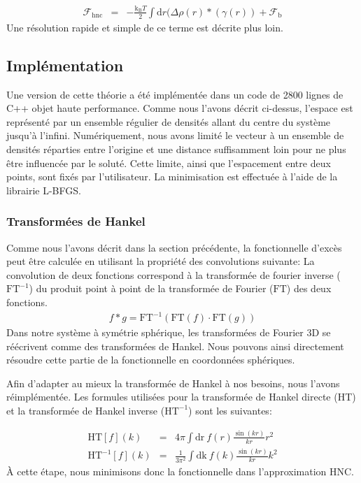\begin{eqnarray}
\mathcal{F}_\mathrm{hnc} &=& -\frac{\mathrm{k_B}T}{2} \int \mathrm{d} r (\Delta\rho\left(r \right)  \ast (\gamma(r)) + \mathcal{F}_\mathrm{b}
\end{eqnarray}
Une résolution rapide et simple de ce terme est décrite plus loin.




\subsection{Implémentation}
Une version de cette théorie a été implémentée dans un code de 2800 lignes de C++ objet haute performance. Comme nous l'avons décrit ci-dessus, l'espace est représenté par un ensemble régulier de densités allant du centre du système jusqu'à l'infini. Numériquement, nous avons limité le vecteur à un ensemble de densités réparties entre l'origine et une distance suffisamment loin pour ne plus être influencée par le soluté. Cette limite, ainsi que l'espacement entre deux points, sont fixés par l'utilisateur.
La minimisation est effectuée à l'aide de la librairie L-BFGS\cite{zhu_algorithm_1997}.

\subsubsection{Transformées de Hankel}
Comme nous l'avons décrit dans la section précédente, la fonctionnelle d'excès peut être calculée en utilisant la propriété des convolutions suivante: La convolution de deux fonctions correspond à la transformée de fourier inverse ($\mathrm{FT}^{-1}$) du produit point à point de la transformée de Fourier ($\mathrm{FT}$) des deux fonctions.
\begin{eqnarray}
f \ast g  = \mathrm{FT}^{-1}(\mathrm{FT}(f)\cdot\mathrm{FT}(g))
\end{eqnarray}
Dans notre système à symétrie sphérique, les transformées de Fourier 3D se réécrivent comme des transformées de Hankel. Nous pouvons ainsi directement résoudre cette partie de la fonctionnelle en coordonnées sphériques.



Afin d'adapter au mieux la transformée de Hankel à nos besoins, nous l'avons réimplémentée. Les formules utilisées pour la transformée de Hankel directe (HT) et la transformée de Hankel inverse ($\mathrm{HT}^{-1}$) sont les suivantes:


\begin{eqnarray}
\mathrm{HT}[f](k) &=& 4\pi\int \mathrm{dr}\ f(r)\frac{\sin(kr)}{kr}r^2\\
\mathrm{HT}^{-1}[f](k) &=& \frac{1}{3\pi^2}\int \mathrm{dk}\ f(k)\frac{\sin(kr)}{kr}k^2
\end{eqnarray}
À cette étape, nous minimisons donc la fonctionnelle dans l'approximation HNC.  


